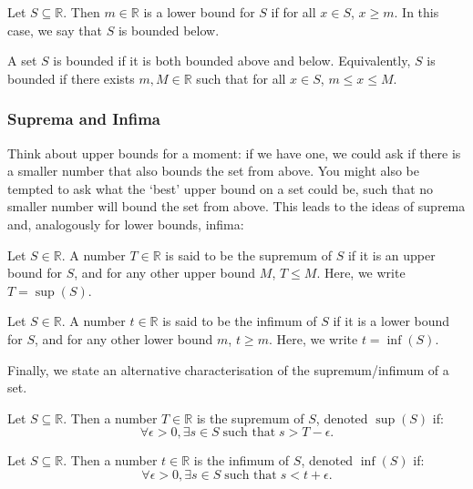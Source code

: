 \documentclass[
  10pt,
  a4paper]{article}
\theoremstyle{plain}
\theoremstyle{definition}
\theoremstyle{plain}
\theoremstyle{plain}
\theoremstyle{plain}
\theoremstyle{plain}
\theoremstyle{definition}
\theoremstyle{definition}
\theoremstyle{remark}
\theoremstyle{remark}
\let\BeginKnitrBlock\begin \let\EndKnitrBlock\end
\begin{document}
\BeginKnitrBlock{definition}[Lower Bound]
{\label{def:def7} }Let \(S \subseteq \mathbb{R}\). Then \(m \in \mathbb{R}\) is a lower bound for \(S\) if for all \(x \in S\), \(x \geq m\). In this case, we say that \(S\) is bounded below.
\EndKnitrBlock{definition}

\BeginKnitrBlock{definition}[Bounded Set]
{\label{def:def8} }A set \(S\) is bounded if it is both bounded above and below. Equivalently, \(S\) is bounded if there exists \(m, M \in \mathbb{R}\) such that for all \(x \in S\), \(m\leq x \leq M\).
\EndKnitrBlock{definition}

\hypertarget{suprema-and-infima}{%
\subsubsection{Suprema and Infima}\label{suprema-and-infima}}

Think about upper bounds for a moment: if we have one, we could ask if there is a smaller number that also bounds the set from above. You might also be tempted to ask what the `best' upper bound on a set could be, such that no smaller number will bound the set from above. This leads to the ideas of suprema and, analogously for lower bounds, infima:

\BeginKnitrBlock{definition}[Supremum]
{\label{def:def9} }Let \(S \in \mathbb{R}\). A number \(T \in \mathbb{R}\) is said to be the supremum of \(S\) if it is an upper bound for \(S\), and for any other upper bound \(M\), \(T \leq M\). Here, we write \(T = \sup(S)\).
\EndKnitrBlock{definition}

\BeginKnitrBlock{definition}[Infimum]
{\label{def:def10} }Let \(S \in \mathbb{R}\). A number \(t \in \mathbb{R}\) is said to be the infimum of \(S\) if it is a lower bound for \(S\), and for any other lower bound \(m\), \(t\geq m\). Here, we write \(t = \inf(S)\).
\EndKnitrBlock{definition}

Finally, we state an alternative characterisation of the supremum/infimum of a set.
\BeginKnitrBlock{proposition}
{\label{prp:prop2} }Let \(S\subseteq\mathbb{R}\). Then a number \(T\in\mathbb{R}\) is the supremum of \(S\), denoted \(\sup(S)\) if: \[\forall \epsilon > 0, \exists s \in S\; \text{such that} \; s > T - \epsilon.\]
\EndKnitrBlock{proposition}

\BeginKnitrBlock{proposition}
{\label{prp:prop3} }Let \(S\subseteq\mathbb{R}\). Then a number \(t\in\mathbb{R}\) is the infimum of \(S\), denoted \(\inf(S)\) if: \[\forall \epsilon > 0, \exists s \in S\; \text{such that} \; s < t + \epsilon.\]
\EndKnitrBlock{proposition}
\end{document}
